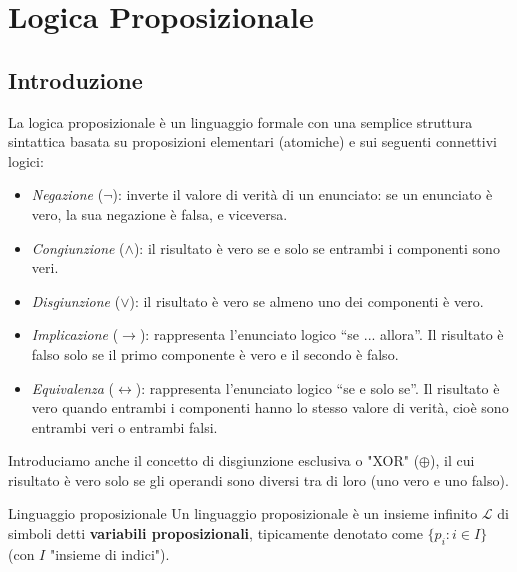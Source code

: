 \documentclass[a4paper,11pt]{report}
\begin{document}
\makecustomcover

\tableofcontents

\chapter{Logica Proposizionale}

\section{Introduzione}

La logica proposizionale è un linguaggio formale con una semplice struttura sintattica basata su proposizioni elementari (atomiche) e sui seguenti connettivi logici:


\begin{itemize}
    \item \textit{Negazione} ($\neg$): inverte il valore di verità di un enunciato: se un enunciato è vero, la sua negazione è falsa, e viceversa.

    \item \textit{Congiunzione} ($\land$): il risultato è vero se e solo se entrambi i componenti sono veri.

    \item \textit{Disgiunzione} ($\lor$): il risultato è vero se almeno uno dei componenti è vero.

    \item \textit{Implicazione} ($\to$): rappresenta l’enunciato logico “se ... allora”. Il risultato è falso solo se il primo componente è vero e il secondo è falso. 

    \item \textit{Equivalenza} ($\leftrightarrow$): rappresenta l’enunciato logico “se e solo se”. 
        Il risultato è vero quando entrambi i componenti hanno lo stesso valore di verità, cioè sono entrambi veri o entrambi falsi.
\end{itemize}

Introduciamo anche il concetto di disgiunzione esclusiva o "XOR" (\( \oplus \)), il cui risultato è vero solo se gli operandi sono diversi tra di loro (uno vero e uno falso).

\begin{defframe}{Linguaggio proposizionale}{}
    Un linguaggio proposizionale è un insieme infinito \( \mathcal{L} \) di simboli detti \textbf{variabili proposizionali}, tipicamente denotato come \( \{p_i : i \in I\} \) {\color{gray} (con \( I \) "insieme di indici")}.
\end{defframe}
\end{document}
